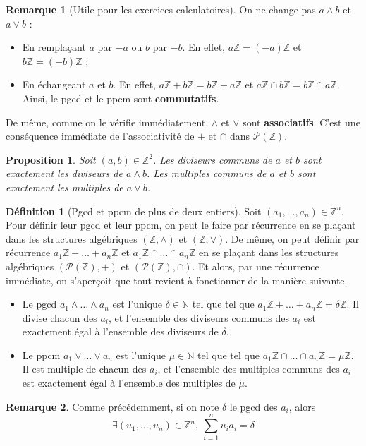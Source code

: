 \documentclass[french]{book}
\newcommand{\N}{\mathbb{N}}
\newcommand{\Z}{\mathbb{Z}}
\theoremstyle{plain}
\newtheorem{prop}{Proposition}[chapter]
\theoremstyle{definition}
\newtheorem{dfn}{Définition}[chapter]
\newtheorem{rmq}{Remarque}[chapter]
\theoremstyle{remark}
\begin{document}
\begin{rmq}[Utile pour les exercices calculatoires]
	On ne change pas $a\wedge b$ et $a\vee b$ :
	\begin{itemize}
		\item En remplaçant $a$ par $-a$ ou $b$ par $-b$. En effet, $a\Z=(-a)\Z$ et $b\Z=(-b)\Z$ ;
		\item En échangeant $a$ et $b$. En effet, $a\Z+b\Z=b\Z+a\Z$ et $a\Z\cap b\Z=b\Z\cap a\Z$. Ainsi, le pgcd et le ppcm sont \textbf{commutatifs}.
	\end{itemize}
	De même, comme on le vérifie immédiatement, $\wedge$ et $\vee$ sont \textbf{associatifs}. C'est une conséquence immédiate de l'associativité de $+$ et $\cap$ dans $\mathcal{P}(\Z)$.
\end{rmq}
\begin{prop}
	Soit $(a,b)\in\Z^2$. Les diviseurs communs de $a$ et $b$ sont exactement les diviseurs de $a\wedge b$. Les multiples communs de $a$ et $b$ sont exactement les multiples de $a\vee b$.
\end{prop}
\begin{dfn}[Pgcd et ppcm de plus de deux entiers]
	 Soit $(a_1,\ldots,a_n)\in\Z^n$. Pour définir leur pgcd et leur ppcm, on peut le faire par récurrence en se plaçant dans les structures algébriques $(\Z,\wedge)$ et $(\Z,\vee)$. De même, on peut définir par récurrence $a_1\Z+\ldots+a_n\Z$ et $a_1\Z\cap\ldots\cap a_n\Z$ en se plaçant dans les structures algébriques $(\mathcal{P}(\Z),+)$ et $(\mathcal{P}(\Z),\cap)$. Et alors, par une récurrence immédiate, on s'aperçoit que tout revient à fonctionner de la manière suivante.
	 \begin{itemize}
	 	\item Le pgcd $a_1\wedge\ldots\wedge a_n$ est l'unique $\delta\in\N$ tel que tel que $a_1\Z+\ldots+a_n\Z=\delta\Z$. Il divise chacun des $a_i$, et l'ensemble des diviseurs communs des $a_i$ est exactement égal à l'ensemble des diviseurs de $\delta$.
	 	\item Le ppcm $a_1\vee\ldots\vee a_n$ est l'unique $\mu\in\N$ tel que tel que $a_1\Z\cap\ldots\cap a_n\Z=\mu\Z$. Il est multiple de chacun des $a_i$, et l'ensemble des multiples communs des $a_i$ est exactement égal à l'ensemble des multiples de $\mu$.
	 \end{itemize}
\end{dfn}
\begin{rmq}
	Comme précédemment, si on note $\delta$ le pgcd des $a_i$, alors $$\exists(u_1,\ldots,u_n)\in\Z^n, \ \sum_{i=1}^{n}u_ia_i=\delta$$
\end{rmq}
\end{document}
